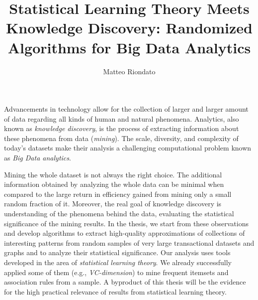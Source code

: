 \documentclass[12pt]{article}
\title{Statistical Learning Theory Meets Knowledge Discovery: Randomized Algorithms for Big Data Analytics}
\author{Matteo Riondato}
\date{}
\begin{document}
\maketitle
\thispagestyle{empty}
Advancements in technology %
allow for the collection of larger and larger  amount of data regarding all kinds of human
and natural %
phenomena.
Analytics, also known as \emph{knowledge discovery}, is the process of extracting
information about these phenomena from data (\emph{mining}). 
The scale, diversity, and complexity of today's datasets make their analysis a
challenging computational problem known as \emph{Big Data
analytics}.

Mining the whole dataset is not always the right choice. %
The additional information obtained by analyzing the whole data can be
minimal when compared to the large return in efficiency
gained from mining only a small random fraction of it. Moreover, %
the real goal of knowledge discovery is understanding of the phenomena behind 
the data, evaluating the statistical significance of the mining
results. In the thesis, we start from these observations and develop algorithms
to extract high-quality approximations of collections of interesting
patterns from random samples of very large transactional datasets and graphs and to
analyze their statistical significance. Our analysis uses 
tools developed in the area of \emph{statistical learning theory}. %
We already successfully applied some of them (e.g., \emph{VC-dimension}) 
to mine frequent itemsets and association rules from a
sample. %
A byproduct of this thesis will be the evidence for the high practical relevance
of results from statistical learning theory.
\end{document}
